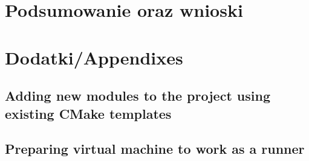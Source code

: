 \chapter{Podsumowanie oraz wnioski}
\label{cha:summary}


\appendix
\chapter{Dodatki/Appendixes}
\label{cha:app}

\section{Adding new modules to the project using existing CMake templates}
\section{Preparing virtual machine to work as a runner}